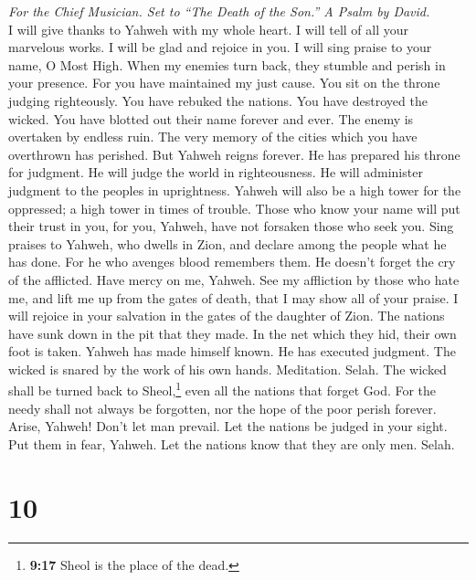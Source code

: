 \emph{For the Chief Musician. Set to ``The Death of the Son.'' A Psalm
by David.}\\
 I will give thanks to Yahweh with my whole heart. I will
tell of all your marvelous works.  I will be glad and
rejoice in you. I will sing praise to your name, O Most High.
 When my enemies turn back, they stumble and perish in
your presence.  For you have maintained my just cause. You
sit on the throne judging righteously.  You have rebuked
the nations. You have destroyed the wicked. You have blotted out their
name forever and ever.  The enemy is overtaken by endless
ruin. The very memory of the cities which you have overthrown has
perished.  But Yahweh reigns forever. He has prepared his
throne for judgment.  He will judge the world in
righteousness. He will administer judgment to the peoples in
uprightness.  Yahweh will also be a high tower for the
oppressed; a high tower in times of trouble.  Those who
know your name will put their trust in you, for you, Yahweh, have not
forsaken those who seek you.  Sing praises to Yahweh, who
dwells in Zion, and declare among the people what he has done.
 For he who avenges blood remembers them. He doesn't
forget the cry of the afflicted.  Have mercy on me,
Yahweh. See my affliction by those who hate me, and lift me up from the
gates of death,  that I may show all of your praise. I
will rejoice in your salvation in the gates of the daughter of Zion.
 The nations have sunk down in the pit that they made. In
the net which they hid, their own foot is taken.  Yahweh
has made himself known. He has executed judgment. The wicked is snared
by the work of his own hands. Meditation. Selah.  The
wicked shall be turned back to Sheol,\footnote{\textbf{9:17} Sheol is
  the place of the dead.} even all the nations that forget God.
 For the needy shall not always be forgotten, nor the
hope of the poor perish forever.  Arise, Yahweh! Don't
let man prevail. Let the nations be judged in your sight.
 Put them in fear, Yahweh. Let the nations know that they
are only men. Selah.

\hypertarget{section-9}{%
\section{10}\label{section-9}}


